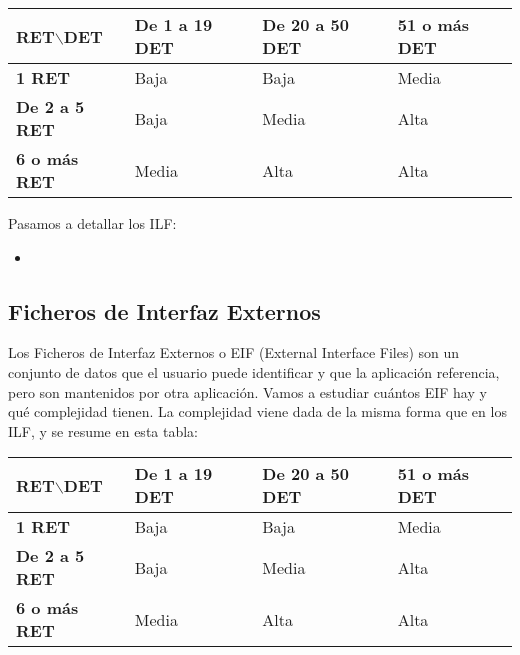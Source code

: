 \documentclass[spanish,a4paper,12pt]{report}	%
\begin{document}
\vspace{0.35cm}

			\begin{tabular}{|p{3cm}||p{3cm}|p{3.2cm}|p{3cm}|}
				\hline
				\textbf{RET$\backslash$DET} & \textbf{De 1 a 19 DET} & \textbf{De 20 a 50 DET} & \textbf{51  o más DET} \\ \hline \hline
				\textbf{1 RET} & Baja & Baja & Media \\ \hline 
				\textbf{De 2 a 5 RET} & Baja & Media & Alta \\ \hline 
				\textbf{6 o más RET} & Media & Alta & Alta \\ \hline 
			\end{tabular}

\vspace{0.35cm}

	Pasamos a detallar los ILF:
	\begin{itemize}
		\item{} 

	\end{itemize}

	

	\subsection{Ficheros de Interfaz Externos}
		Los Ficheros de Interfaz Externos o EIF (External Interface Files) son un conjunto de datos que el usuario puede identificar y que la aplicación referencia, pero son mantenidos por otra aplicación. Vamos a estudiar cuántos EIF hay y qué complejidad tienen. La complejidad viene dada de la misma forma que en los ILF, y se resume en esta tabla: 

\vspace{0.35cm}

			\begin{tabular}{|p{3cm}||p{3cm}|p{3.2cm}|p{3cm}|}
				\hline
				\textbf{RET$\backslash$DET} & \textbf{De 1 a 19 DET} & \textbf{De 20 a 50 DET} & \textbf{51  o más DET} \\ \hline \hline
				\textbf{1 RET} & Baja & Baja & Media \\ \hline 
				\textbf{De 2 a 5 RET} & Baja & Media & Alta \\ \hline 
				\textbf{6 o más RET} & Media & Alta & Alta \\ \hline 
			\end{tabular}

\vspace{0.35cm}
\end{document}
